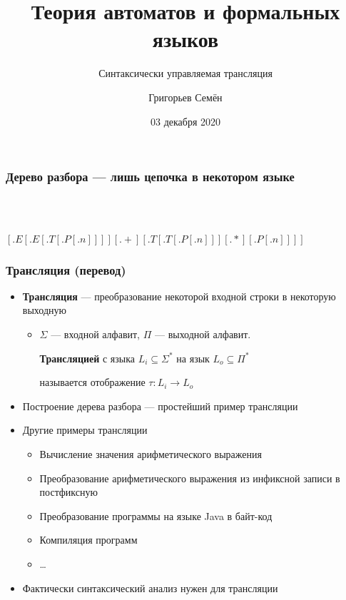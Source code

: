 \documentclass{beamer}
\title[]{Теория автоматов и формальных языков}
\subtitle[]{Синтаксически управляемая трансляция}
\institute[]{
Санкт-Петербургский государственный университет\\
}
\author[]{Григорьев Семён}
\date{03 декабря 2020}
\begin{document}
{
  \begin{frame}
    \titlepage
  \end{frame}
}

\begin{frame}[fragile]
  \transwipe[direction=90]
  \frametitle{Дерево разбора --- лишь цепочка в некотором языке }
\begin{center}
  \pause
  
  ~\\~
  
$[.E [.E [.T [.P [.n ] ] ] ] [.+ ] [.T [.T [.P [.n ] ] ] [.* ] [.P [.n ] ] ] ]$  
\end{center}  
\end{frame}


\begin{frame}[fragile]
  \transwipe[direction=90]
  \frametitle{Трансляция (перевод)}
  \begin{itemize}
    \item \textbf{Трансляция} --- преобразование некоторой входной строки в некоторую выходную
    \begin{itemize}
      \item $\Sigma$ --- входной алфавит, $\Pi$ --- выходной алфавит. 
      
      \textbf{Трансляцией} с языка $L_i \subseteq \Sigma^*$ на язык $L_o \subseteq \Pi^*$ 
      
      называется отображение $\tau : L_i \rightarrow L_o$
    \end{itemize}
    \item Построение дерева разбора --- простейший пример трансляции
    \item Другие примеры трансляции
    \begin{itemize}
      \item Вычисление значения арифметического выражения
      \item Преобразование арифметического выражения из инфиксной записи в постфиксную
      \item Преобразование программы на языке Java в байт-код
      \item Компиляция программ
      \item \dots
    \end{itemize}
    \item Фактически синтаксический анализ нужен для трансляции
  \end{itemize}
\end{frame}
\end{document}
